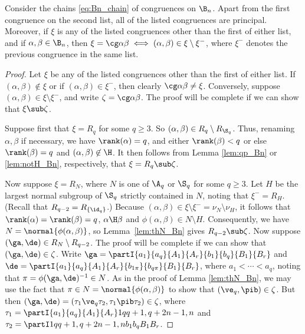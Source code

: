 %
\begin{proposition}\label{prop:chain_Bn}
Consider the chains \eqref{eq:Bn_chain} of congruences on $\B_n$.
%
Apart from the first congruence on the second list, all of the listed congruences are principal.  Moreover, if $\xi$ is any of the listed congruences other than the first of either list, and if $\alpha,\beta\in\B_n$, then $\xi=\cg\alpha\beta\iff(\alpha,\beta)\in\xi\setminus\xi^-$, where $\xi^-$ denotes the previous congruence in the same list.
\end{proposition}

\begin{proof} Let $\xi$ be any of the listed congruences other than the first of either
list.  If $(\alpha,\beta)\not\in\xi$ or if $(\alpha,\beta)\in\xi^-$, then clearly
$\cg\alpha\beta\not=\xi$.  Conversely, suppose $(\alpha,\beta)\in\xi\setminus\xi^-$, and write $\zeta=\cg\alpha\beta$.  The proof will be complete if we can show that $\xi\sub\zeta$.

\bigskip{}  Suppose first that $\xi=R_q$ for some $q\geq3$.  So $(\alpha,\beta)\in R_q\setminus R_{\S_q}$.  Thus, renaming $\alpha,\beta$ if necessary, we have $\rank(\alpha)=q$, and either $\rank(\beta)<q$ or else $\rank(\beta)=q$ and $(\alpha,\beta)\not\in{\H}$.  It then follows from Lemma \ref{lem:qp_Bn} or \ref{lem:notH_Bn}, respectively, that $\xi=R_q\sub\zeta$.

\bigskip{}  Now suppose $\xi=R_{N}$, where $N$ is one of $\A_q$ or $\S_q$ for some $q\geq3$.  Let $H$ be the largest normal subgroup of $\S_q$ strictly contained in $N$,
noting that $\xi^-=R_H$.  (Recall that $R_{q-2}=R_{\{\id_q\}}$.)  Because
$(\alpha,\beta)\in\xi\setminus\xi^-=\nu_N\setminus\nu_H$, it follows that $\rank(\alpha)=\rank(\beta)=q$,
$\alpha\H\beta$ and $\phi(\alpha,\beta)\in N\setminus H$.  Consequently, we have
$N=\normal{\phi(\alpha,\beta)}$, so Lemma~\ref{lem:thN_Bn} gives $R_{q-2}\sub\zeta$.
Now suppose $(\ga,\de)\in R_N\setminus R_{q-2}$.  The proof will be complete if we can show that $(\ga,\de)\in\zeta$.  Write $\ga=
\partI{a_1}{a_q}{A_1}{A_r}{b_1}{b_q}{B_1}{B_r}$ and $\de=\partI{a_1}{a_q}{A_1}{A_r}{b_{1\pi}}{b_{q\pi}}{B_1}{B_r}$, where $a_1<\cdots<a_q$, noting that $\pi=\phi(\ga,\de)^{-1}\in N$.  As in the proof of Lemma \ref{lem:thN_Bn}, we may use the fact that $\pi\in N=\normal{\phi(\alpha,\beta)}$ to show that $(\ve_q,\pib)\in\zeta$.  But then $(\ga,\de)=(\tau_1\ve_q\tau_2,\tau_1\pib\tau_2)\in\zeta$, where $\tau_1=\partI{a_1}{a_q}{A_1}{A_r}1q{q+1,q+2}{n-1,n}$ and $\tau_2=\partI1q{q+1,q+2}{n-1,n}{b_1}{b_q}{B_1}{B_r}$. \end{proof}






